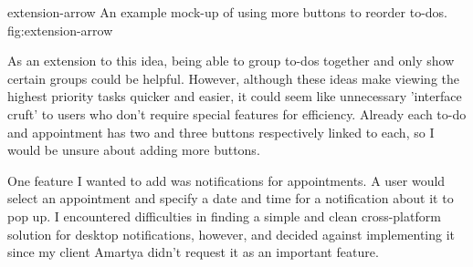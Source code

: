 \addsmallfigure
    {extension-arrow}
    {An example mock-up of using more buttons to reorder to-dos.}
    {fig:extension-arrow}

As an extension to this idea, being able to group to-dos together and only show
certain groups could be helpful. However, although these ideas make viewing the
highest priority tasks quicker and easier, it could seem like unnecessary
'interface cruft' to users who don't require special features for efficiency.
Already each to-do and appointment has two and three buttons respectively linked
to each, so I would be unsure about adding more buttons.

One feature I wanted to add was notifications for appointments. A user would
select an appointment and specify a date and time for a notification about
it to pop up. I encountered difficulties in finding a simple and clean
cross-platform solution for desktop notifications, however, and decided against
implementing it since my client Amartya didn't request it as an important
feature.
